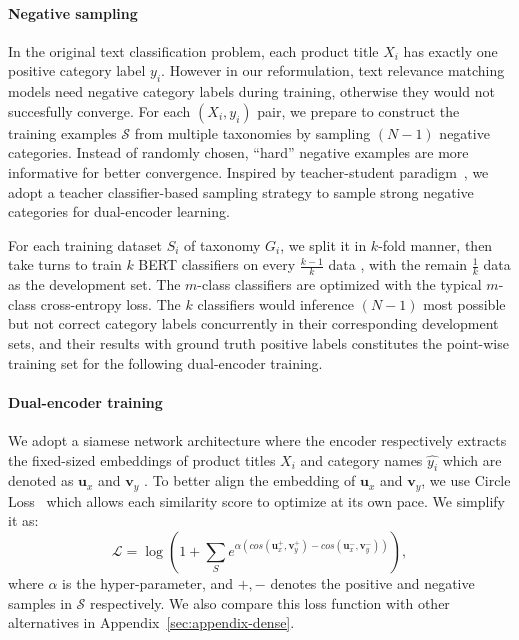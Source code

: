 \paragraph{Negative sampling}
\label{sec:prepare}
In the original text classification problem, each product title $X_i$ has exactly one positive category label $y_i$.
However in our reformulation, text relevance matching models need negative category labels during training, otherwise they would not succesfully converge.
For each $(X_i, y_i)$ pair, we prepare to construct the training examples $\mathcal{S}$ from multiple taxonomies by sampling $(N-1)$ negative categories. Instead of randomly chosen, ``hard'' negative examples are more informative for better convergence. Inspired by teacher-student paradigm~\cite{hinton2015distilling}, we adopt a teacher classifier-based sampling strategy to sample strong negative categories for dual-encoder learning.

For each training dataset $S_i$ of taxonomy $G_i$, 
we split it in $k$-fold manner, then take turns to train $k$ BERT classifiers on every $\frac{k-1}{k}$ data 
, with the remain $\frac{1}{k}$ data as the development set. The $m$-class classifiers are optimized with the typical $m$-class cross-entropy loss. 
The $k$ classifiers would inference $(N-1)$ most possible but not correct category labels concurrently in their corresponding development sets, and their results with ground truth positive labels constitutes the point-wise training set for the following dual-encoder training.
\paragraph{Dual-encoder training}
We adopt a siamese network architecture \cite{reimers2019sentence} where the encoder respectively extracts the fixed-sized embeddings of product titles $X_i$ and category names $\hat{y_i}$ which are denoted as $\mathbf{u}_x$ and $\mathbf{v}_y$
. 
To better align the embedding of $\mathbf{u}_x$ and $\mathbf{v}_y$, we use Circle Loss~\cite{sun2020circle} which allows each similarity score to optimize at its own pace. We simplify it as:
\begin{equation}
    \label{eq:loss}
    \mathcal{L}=\log \left(1+\sum_{S} e^{\alpha (cos(\mathbf{u}_x^+,\mathbf{v}_y^+)-cos(\mathbf{u}_x^-,\mathbf{v}_y^-))}\right),
\end{equation}
where $\alpha$ is the hyper-parameter, and $+,-$ denotes the positive and negative samples in $\mathcal{S}$ respectively. We also compare this loss function with other alternatives in Appendix~\ref{sec:appendix-dense}.
